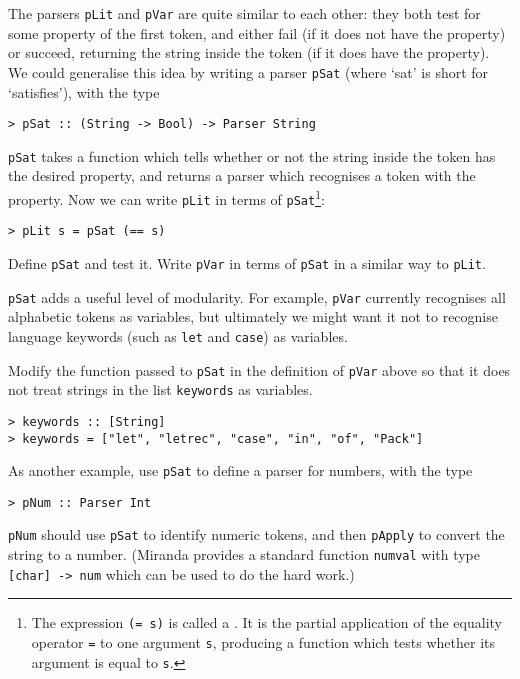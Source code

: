 The parsers \mbox{\tt pLit} and \mbox{\tt pVar} are quite similar to each other:
they both test for some
property of the first token, and either fail (if it does not have the
property) or succeed, returning the string inside the token (if it does
have the property).  We could generalise this idea by writing a parser
\mbox{\tt pSat} (where `sat' is short for `satisfies'), with the type
\begin{verbatim}
> pSat :: (String -> Bool) -> Parser String
\end{verbatim}
%
\mbox{\tt pSat} takes a function which tells whether or not the string inside the token
has the desired property, and returns a parser which recognises a token
with the property.  Now we can write \mbox{\tt pLit} in terms of
\mbox{\tt pSat}\footnote{%
The expression \mbox{\tt (=\ s)} is
called a .  It is the partial application of
the equality operator \mbox{\tt =} to one argument \mbox{\tt s},  producing a function which
tests whether its argument is equal to \mbox{\tt s}.
}:
\begin{verbatim}
> pLit s = pSat (== s)
\end{verbatim}
%
\begin{exercise}
\label{ex:pSat}
Define \mbox{\tt pSat} and test it.
Write \mbox{\tt pVar} in terms of \mbox{\tt pSat} in a similar way to \mbox{\tt pLit}.
\end{exercise}

\mbox{\tt pSat} adds a useful level of modularity.
For example, \mbox{\tt pVar} currently recognises all alphabetic tokens as
variables, but ultimately we might want it not to recognise language
keywords (such as \mbox{\tt let} and \mbox{\tt case}) as variables.
\begin{exercise}
\label{ex:pVar}
Modify the function
passed to \mbox{\tt pSat} in the definition of \mbox{\tt pVar} above so that it does not
treat strings in the list \mbox{\tt keywords} as variables.
\begin{verbatim}
> keywords :: [String]
> keywords = ["let", "letrec", "case", "in", "of", "Pack"]
\end{verbatim}
%
%
\end{exercise}
\begin{exercise}
\label{ex:pNum}
As another example, use \mbox{\tt pSat} to define a parser for numbers,
with the type
\begin{verbatim}
> pNum :: Parser Int
\end{verbatim}
%
\mbox{\tt pNum} should use \mbox{\tt pSat} to identify numeric tokens, and then \mbox{\tt pApply} to
convert the string to a number.  (Miranda provides a standard function \mbox{\tt numval}
with type \mbox{\tt [char]\ ->\ num} which can be used to do the hard work.)
\end{exercise}

